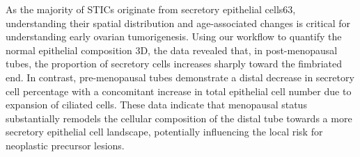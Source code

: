 \begin{refsection}
    As the majority of STICs originate from secretory epithelial cells63, understanding their spatial distribution and age-associated changes is critical for understanding early ovarian tumorigenesis. Using our workflow to quantify the normal epithelial composition 3D, the data revealed that, in post-menopausal tubes, the proportion of secretory cells increases sharply toward the fimbriated end. In contrast, pre-menopausal tubes demonstrate a distal decrease in secretory cell percentage with a concomitant increase in total epithelial cell number due to expansion of ciliated cells. These data indicate that menopausal status substantially remodels the cellular composition of the distal tube towards a more secretory epithelial cell landscape, potentially influencing the local risk for neoplastic precursor lesions.
    

\end{refsection}
